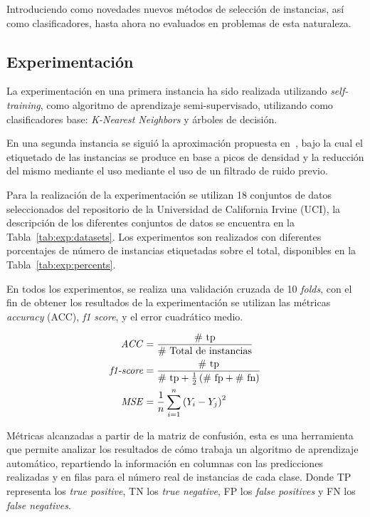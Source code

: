 Introduciendo como novedades nuevos métodos de selección de instancias, así como clasificadores, hasta ahora no evaluados en problemas de esta naturaleza.

\subsection{Experimentación}
La experimentación en una primera instancia ha sido realizada utilizando \textit{self-training}, como algoritmo de aprendizaje semi-supervisado, utilizando como clasificadores base: \textit{K-Nearest Neighbors} y árboles de decisión. 

En una segunda instancia se siguió la aproximación propuesta en~\cite{li2019selfk}, bajo la cual el etiquetado de las instancias se produce en base a picos de densidad y la reducción del mismo mediante el uso mediante el uso de un filtrado de ruido previo.

Para la realización de la experimentación se utilizan 18 conjuntos de datos seleccionados del repositorio de la Universidad de California Irvine (UCI), la descripción de los diferentes conjuntos de datos se encuentra en la Tabla~\ref{tab:exp:datasets}. Los experimentos son realizados con diferentes porcentajes de número de instancias etiquetadas sobre el total, disponibles en la Tabla~\ref{tab:exp:percents}.

En todos los experimentos, se realiza una validación cruzada de 10 \textit{folds}, con el fin de obtener los resultados de la experimentación se utilizan las métricas \textit{accuracy} (ACC), \textit{f1 score}, y el error cuadrático medio.

\begin{align}
\text{\textit{ACC}} & = \frac{\text{\# tp}}{\text{\# Total de instancias}} \\
\text{\textit{f1-score}} & = \frac{\text{\# tp}}{\text{\# tp} + \frac{1}{2}\left( \text{\# fp} + \text{\# fn}\right)} \\
\text{\textit{MSE}} & = \frac{1}{n} \sum_{i=1}^{n}\left(Y_i - Y_j\right)^2
\end{align}

\noindent Métricas alcanzadas a partir de la matriz de confusión, esta es una herramienta que permite analizar los resultados de cómo trabaja un algoritmo de aprendizaje automático, repartiendo la información en columnas con las predicciones realizadas y en filas para el número real de instancias de cada clase. 
Donde TP representa los \textit{true positive}, TN los \textit{true negative}, FP los \textit{false positives} y FN los \textit{false negatives}. 

